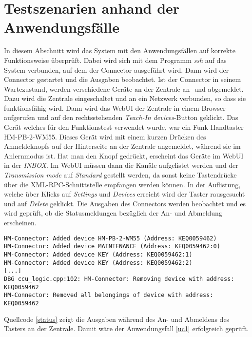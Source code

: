 \section{Testszenarien anhand der Anwendungsfälle}
In diesem Abschnitt wird das System mit den Anwendungsfällen auf korrekte Funktionsweise überprüft.
Dabei wird sich mit dem Programm \emph{ssh} \cite{ssh} auf das System verbunden, auf dem der Connector
ausgeführt wird.
Dann wird der Connector gestartet und die Ausgaben beobachtet.
Ist der Connector in seinem Wartezustand, werden verschiedene Geräte an der Zentrale an- und abgemeldet.
Dazu wird die Zentrale eingeschaltet und an ein Netzwerk verbunden, so dass sie funktionsfähig wird.
Dann wird das WebUI der Zentrale in einem Browser aufgerufen und auf den rechtsstehenden \emph{Teach-In devices}-Button
geklickt.
Das Gerät welches für den Funktionstest verwendet wurde, war ein Funk-Handtaster HM-PB-2-WM55.
Dieses Gerät wird mit einem kurzen Drücken des Anmeldeknopfs auf der Hinterseite an der Zentrale angemeldet, während
sie im Anlernmodus ist.
Hat man den Knopf gedrückt, erscheint das Geräte im WebUI in der \emph{INBOX}.
Im WebUI müssen dann die Kanäle aufgelistet werden und der \emph{Transmission mode} auf \emph{Standard} gestellt werden,
da sonst keine Tastendrücke über die XML-RPC-Schnittstelle empfangen werden können.
In der Auflistung, welche über Klicks auf \emph{Settings} und \emph{Devices} erreicht wird der Taster rausgesucht
und auf \emph{Delete} geklickt.
Die Ausgaben des Connectors werden beobachtet und es wird geprüft, ob die Statusmeldungen bezüglich
der An- und Abmeldung erscheinen.

\begin{lstlisting}[frame=single,caption={Ausgaben des Connectors bei An- und Abmelden von HomeMatic-Geräten an der Zentrale},label=status]
HM-Connector: Added device HM-PB-2-WM55 (Address: KEQ0059462)
HM-Connector: Added device MAINTENANCE (Address: KEQ0059462:0)
HM-Connector: Added device KEY (Address: KEQ0059462:1)
HM-Connector: Added device KEY (Address: KEQ0059462:2)
[...]
DBG ccu_logic.cpp:102: HM-Connector: Removing device with address: KEQ0059462
HM-Connector: Removed all belongings of device with address: KEQ0059462
\end{lstlisting}

Quellcode \ref{status} zeigt die Ausgaben während des An- und Abmeldens des Tasters an der Zentrale.
Damit wäre der Anwendungsfall \ref{uc1} erfolgreich geprüft.

